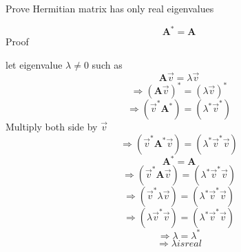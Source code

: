 \documentclass[10pt]{article}
\begin{document}
Prove Hermitian matrix has only real eigenvalues

$$\textbf{A}^\ast = \textbf{A}$$
Proof
 
let eigenvalue $\lambda \neq 0$ such as 
$$\textbf{A}\vec{v}  = \lambda\vec{v}$$
$$\Rightarrow (\textbf{A}\vec{v})^\ast = (\lambda\vec{v})^\ast$$
$$\Rightarrow (\vec{v}^\ast\textbf{A}^\ast)=(\lambda^\ast\vec{v}^\ast)$$
Multiply both side by $\vec{v}$$$\Rightarrow (\vec{v}^\ast\textbf{A}^\ast\vec{v})=(\lambda^\ast\vec{v}^\ast\vec{v})$$
$$\textbf{A}^\ast=\textbf{A}$$
$$\Rightarrow(\vec{v}^\ast\textbf{A}\vec{v})=(\lambda^\ast\vec{v}^\ast\vec{v})$$
$$\Rightarrow(\vec{v}^\ast\lambda\vec{v}) = (\lambda^\ast\vec{v}^\ast\vec{v})$$
$$\Rightarrow(\lambda\vec{v}^\ast\vec{v}) =  (\lambda^\ast\vec{v}^\ast\vec{v})$$
$$\Rightarrow \lambda = \lambda^\ast$$
$$\Rightarrow \lambda is real$$
\end{document}
